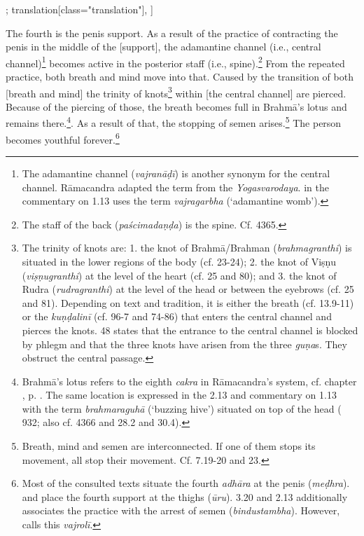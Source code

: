 \begin{alignment}[
  texts=edition[class="edition"];
  translation[class="translation"],
  ]
\begin{translation}
\begin{tlate}[p30_02]
The fourth is the penis support. As a result of the practice of contracting the penis in the middle of the [support], the adamantine channel (i.e., central channel)\footnote{The adamantine channel (\textit{vajranāḍī}) is another synonym for the central channel. Rāmacandra adapted the term from the \textit{Yogasvarodaya}.  in the commentary on 1.13 uses the term \textit{vajragarbha} (`adamantine womb').} becomes active in the posterior staff (i.e., spine).\footnote{The staff of the back (\textit{paścimadaṇḍa}) is the spine. Cf.  4365.} From the repeated practice, both breath and mind move into that. Caused by the transition of both [breath and mind] the trinity of knots\footnote{The trinity of knots are: 1. the knot of Brahmā/Brahman (\textit{brahmagranthi}) is situated in the lower regions of the body (cf.  23-24); 2. the knot of Viṣṇu (\textit{viṣṇugranthi}) at the level of the heart (cf.  25 and  80); and 3. the knot of Rudra (\textit{rudragranthi}) at the level of the head or between the eyebrows (cf.  25 and  81). Depending on text and tradition, it is either the breath (cf.  13.9-11) or the \textit{kuṇḍalinī} (cf.  96-7 and  74-86) that enters the central channel and pierces the knots.  48 states that the entrance to the central channel is blocked by phlegm and that the three knots have arisen from the three \textit{guṇa}s. They obstruct the central passage.} within [the central channel] are pierced. Because of the piercing of those, the breath becomes full in Brahmā's lotus and remains there.\footnote{Brahmā's lotus refers to the eighth \textit{cakra} in Rāmacandra's system, cf. chapter , p. \pageref{cakra8}. The same location is expressed in the  2.13 and  commentary on 1.13 with the term \textit{brahmaraguhā} (`buzzing hive') situated on top of the head ( 932; also cf.  4366 and  28.2 and 30.4).}. As a result of that, the stopping of semen arises.\footnote{Breath, mind and semen are interconnected. If one of them stops its movement, all stop their movement. Cf.  7.19-20 and 23.} The person becomes youthful forever.\footnote{Most of the consulted texts situate the fourth \textit{adhāra} at the penis (\textit{meḍhra}).  and  place the fourth support at the thighs (\textit{ūru}).  3.20 and  2.13 additionally associates the practice with the arrest of semen (\textit{bindustambha}). However,  calls this \textit{vajrolī}.}


\end{tlate}
\end{translation}
\end{alignment}
